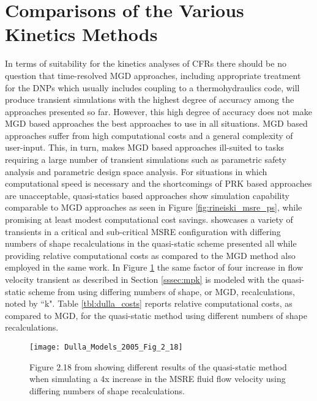 \documentclass[review]{elsarticle}
\begin{document}
\section{Comparisons of the Various Kinetics Methods}
\label{sec:comp}
In terms of suitability for the kinetics analyses of CFRs there should be no
question that time-resolved MGD approaches, including appropriate treatment
for the DNPs which usually includes coupling to a thermohydraulics code, will
produce transient simulations with the highest degree of accuracy among the
approaches presented so far. However, this high degree of accuracy does not
make MGD based approaches the best approaches to use in all situations.
MGD based
approaches suffer from high computational costs and a general complexity of
user-input. This, in turn, makes MGD based approaches ill-suited to tasks
requiring a large number of transient simulations such as parametric safety
analysis and parametric design space analysis.
For situations in which computational speed is necessary and the shortcomings
of PRK based approaches are unacceptable, quasi-statics based approaches
show simulation capability comparable to MGD approaches as seen in
Figure \ref{fig:rineiski_msre_ps}, while promising at
least modest computational cost savings. \cite{dulla_models_2005} showcases
a variety of transients in a critical and sub-critical MSRE configuration with
differing numbers of shape recalculations in the quasi-static scheme presented 
all while providing relative computational costs as compared to the MGD method
also employed in the same work. In Figure \ref{fig:dulla_4x_qs} the same factor
of four increase in flow velocity transient as described in Section
\ref{sssec:mpk} is modeled with the quasi-static scheme from
\cite{dulla_models_2005} using differing numbers of shape, or MGD,
recalculations, noted by ``k". Table \ref{tbl:dulla_costs}
reports relative computational costs, as compared to
MGD, for the quasi-static method using different numbers of shape recalculations.


\begin{figure}[H]
   \centering
   \texttt{[image: Dulla\_Models\_2005\_Fig\_2\_18]}
   \caption{Figure 2.18 from \cite{dulla_models_2005} showing different results of the
   quasi-static method when simulating a 4x increase in the MSRE fluid flow velocity using
   differing numbers of shape recalculations.} 
   \label{fig:dulla_4x_qs}
\end{figure}
\end{document}

